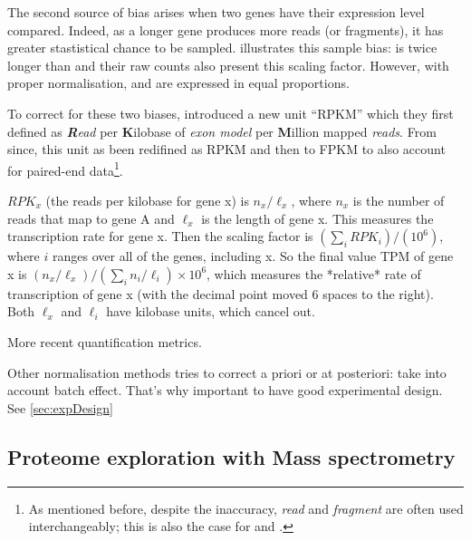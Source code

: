 The second source of bias arises when two genes have their expression level
compared. Indeed, as a longer gene produces more reads (or fragments), it has
greater stastistical chance to be sampled.  illustrates
this sample bias:  is twice longer than  and their
raw counts also present this scaling factor. However, with proper normalisation,
 and  are expressed in equal proportions.

To correct for these two biases, \cite{Mortazavi2008} introduced a new unit
``RPKM'' which they first defined as \emph{\textbf{R}ead} per \textbf{K}ilobase of
\emph{exon model} per \textbf{M}illion mapped \emph{reads}. From since, this unit
as been redifined as \acrlong{RPKM} and then to \acrfull{FPKM} to also
account for paired-end data\footnote{As mentioned before, despite the inaccuracy,
\emph{read} and \emph{fragment} are often used interchangeably;
this is also the case for \emph{\RPKM} and \emph{\FPKM}.}.



$RPK_x$ (the reads per kilobase for gene x) is $n_x/\ell_x$, where $n_x$ is the
number of reads that map to gene A and $\ell_x$ is the length of gene x.
This measures the transcription rate for gene x.
Then the scaling factor is $(\sum_i RPK_i) / (10^6)$,
where $i$ ranges over all of the genes, including x.
So the final value TPM of gene x is $(n_x/\ell_x)/(\sum_i n_i/\ell_i)\times 10^6$,
which measures the *relative* rate of transcription of gene x (with the decimal
point moved 6 spaces to the right). Both $\ell_x$ and $\ell_i$ have kilobase
units, which cancel out.


More recent quantification metrics.

Other normalisation methods tries to correct a priori or at posteriori:
take into account batch effect. That's why important to have good experimental
design. See \cref{sec:expDesign}



\subsection{Proteome exploration with Mass spectrometry}


\begin{comment}
\subsection{Proteomics}
    \subsubsection{Main technologies}
    \subsubsection{Mass sprectrometry}

\end{comment}

